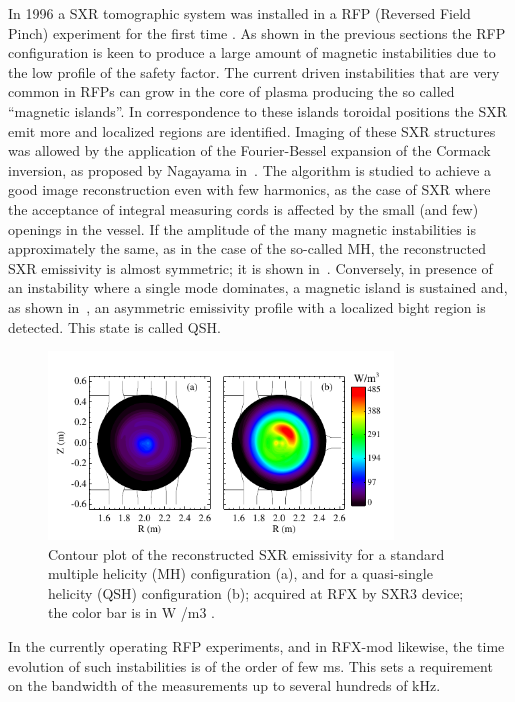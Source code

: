 In 1996 a SXR tomographic system was installed in a RFP (Reversed Field
Pinch) experiment for the first time \cite{Bonomo24}. 
As shown in the previous sections the RFP configuration is keen to produce a large amount of
magnetic instabilities due to the low profile of the safety factor. The current driven instabilities that are very common in RFPs can grow in the core of plasma producing the so called ``magnetic islands''. In correspondence to these islands toroidal positions the SXR emit more and localized regions
are identified. 
Imaging of these SXR structures was allowed by the application of the Fourier-Bessel expansion of the Cormack inversion, as proposed by Nagayama in~\cite{Bonomo25}. 
The algorithm is studied to achieve a good image reconstruction even with few harmonics, as the case of SXR where the acceptance of integral measuring cords  is affected by the small (and few) openings in the vessel. If the amplitude of the many magnetic instabilities is approximately the same, as in the case of the so-called \acl{MH}, the reconstructed SXR emissivity is almost symmetric; it is shown in~. Conversely, in presence of an instability where a single mode dominates, a magnetic island is sustained and, as shown in~, an asymmetric emissivity profile with a localized bight region is detected. This state is called \acl{QSH}.
%
\begin{figure}
    \centering
    \includegraphics[height=5cm]{img/2_eq/MH_QSH_example.png}
    \caption{Contour plot of the reconstructed SXR emissivity for a standard multiple helicity (MH) configuration (a), and for a quasi-single helicity (QSH) configuration (b); acquired at RFX by SXR3 device; the color bar is in W /m3 .
    }
    \label{fig:MH_QSH_example}
\end{figure}
%
In the currently operating RFP experiments, and in RFX-mod likewise, the time evolution of such instabilities is of the order of few ms. This sets a requirement on the bandwidth of the measurements up to several hundreds of kHz.

